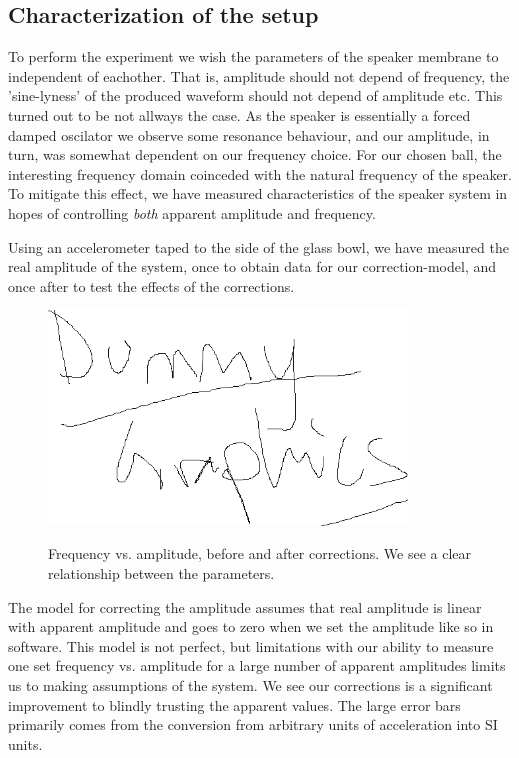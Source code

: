 \documentclass[12pt,oneside,a4paper]{article}
\numberwithin{equation}{section}
\begin{document}
{{{{\subsection{Characterization of the setup}
To perform the experiment we wish the parameters of the speaker membrane to independent of eachother. That is, amplitude should not depend of frequency, the 'sine-lyness' of the produced waveform should not depend of amplitude etc. This turned out to be not allways the case. As the speaker is essentially a forced damped oscilator we observe some resonance behaviour, and our amplitude, in turn, was somewhat dependent on our frequency choice. For our chosen ball, the interesting frequency domain coinceded with the natural frequency of the speaker. To mitigate this effect, we have measured characteristics of the speaker system in hopes of controlling \emph{both} apparent amplitude and frequency.  

Using an accelerometer taped to the side of the glass bowl, we have measured the real amplitude of the system, once to obtain data for our correction-model, and once after to test the effects of the corrections. 
\begin{figure}[H]
\centering
\includegraphics[width=0.85\textwidth]{dummy.png} \label{frq_vs_ampl_plot}
\caption{Frequency vs. amplitude, before and after corrections. We see a clear relationship between the parameters.}
\end{figure}
The model for correcting the amplitude assumes that real amplitude is linear with apparent amplitude and goes to zero when we set the amplitude like so in software. This model is not perfect, but limitations with our ability to measure one set frequency vs. amplitude for a large number of apparent amplitudes limits us to making assumptions of the system. We see our corrections is a significant improvement to blindly trusting the apparent values. The large error bars primarily comes from the conversion from arbitrary units of acceleration into SI units. 

}}}}
\end{document}
